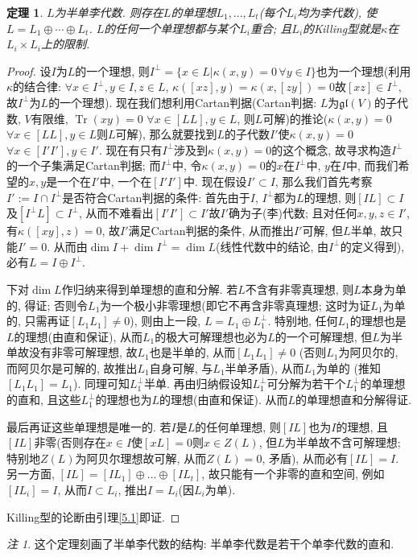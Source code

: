 \documentclass{ctexart}%
\newtheorem{theorem}{定理}
\theoremstyle{definition}
\theoremstyle{remark}
\newtheorem{remark}{注}
\DeclareMathOperator{\Tr}{Tr}
\begin{document}
\begin{theorem}\label{5.2}
$L$为半单李代数. 则存在$L$的单理想$L_1,...,L_t$(每个$L_i$均为李代数), 使$L=L_1\oplus\cdots \oplus L_t$. $L$的任何一个单理想都与某个$L_i$重合; 且$L_i$的Killing型就是$\kappa$在$L_i\times L_i$上的限制.
\end{theorem}
\begin{proof}
设$I$为$L$的一个理想, 则$I^\perp=\{x\in L|\kappa(x,y)=0\,\forall y\in I\}$也为一个理想(利用$\kappa$的结合律: $\forall x\in I^\perp, y\in I, z\in L$, $\kappa([xz],y)=\kappa(x,[zy])=0$故$[xz]\in I^\perp$, 故$I^\perp$为$L$的一个理想). 现在我们想利用Cartan判据(Cartan判据: $L$为$\mathfrak{gl}(V)$的子代数, $V$有限维, $\Tr(xy)=0$ $\forall x\in [LL],y\in L$, 则$L$可解)的推论($\kappa(x,y)=0$ $\forall x\in [LL], y\in L$则$L$可解), 那么就要找到$L$的子代数$I'$使$\kappa(x,y)=0$ $\forall x\in [I'I'], y\in I'$. 现在有只有$I^\perp$涉及到$\kappa(x,y)=0$的这个概念, 故寻求构造$I^\perp$的一个子集满足Cartan判据; 而$I^\perp$中, 令$\kappa(x,y)=0$的$x$在$I^\perp$中, $y$在$I$中, 而我们希望的$x,y$是一个在$I'$中, 一个在$[I'I']$中. 现在假设$I'\subset I$, 那么我们首先考察$I':=I\cap I^\perp$是否符合Cartan判据的条件: 首先由于$I$, $I^\perp$都为$L$的理想, 则$[IL]\subset I$及$[I^\perp L]\subset I^\perp$, 从而不难看出$[I'I']\subset I'$故$I'$确为子(李)代数; 且对任何$x,y,z\in I'$, 有$\kappa([xy],z) = 0$, 故$I'$满足Cartan判据的条件, 从而推出$I'$可解, 但$L$半单, 故只能$I'=0$. 从而由$\dim I+\dim I^\perp = \dim L$(线性代数中的结论, 由$I^\perp$的定义得到), 必有$L=I\oplus I^\perp$.

下对$\dim L$作归纳来得到单理想的直和分解. 若$L$不含有非零真理想, 则$L$本身为单的, 得证; 否则令$L_1$为一个极小非零理想(即它不再含非零真理想; 这时为证$L_1$为单的, 只需再证$[L_1L_1]\neq 0$), 则由上一段, $L=L_1\oplus L_1^\perp$. 特别地, 任何$L_1$的理想也是$L$的理想(由直和保证), 从而$L_1$的极大可解理想也必为$L$的一个可解理想, 但$L$为半单故没有非零可解理想, 故$L_1$也是半单的, 从而$[L_1L_1]\neq 0$ (否则$L_1$为阿贝尔的, 而阿贝尔是可解的, 故推出$L_1$自身可解, 与$L_1$半单矛盾), 从而$L_1$为单的 (推知$[L_1L_1]=L_1$). 同理可知$L_1^\perp$半单. 再由归纳假设知$L_1^\perp$可分解为若干个$L_1^\perp$的单理想的直和, 且这些$L_1^\perp$的理想也为$L$的理想(由直和保证). 从而$L$的单理想直和分解得证.

最后再证这些单理想是唯一的. 若$I$是$L$的任何单理想, 则$[IL]$也为$I$的理想, 且$[IL]$非零(否则存在$x\in I$使$[xL]=0$则$x\in Z(L)$, 但$L$为半单故不含可解理想; 特别地$Z(L)$为阿贝尔理想故可解, 从而$Z(L)=0$, 矛盾), 从而必有$[IL]=I$. 另一方面, $[IL]=[IL_1]\oplus...\oplus[IL_t]$, 故只能有一个非零的直和空间, 例如$[IL_i]=I$, 从而$I\subset L_i$, 推出$I=L_i$(因$L_i$为单).

Killing型的论断由引理\ref{5.1}即证. 
\end{proof}
\begin{remark}
这个定理刻画了半单李代数的结构: 半单李代数是若干个单李代数的直和.
\end{remark}
\end{document}
